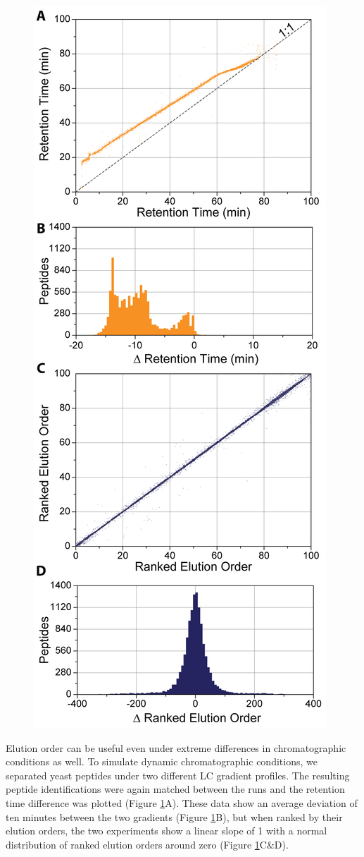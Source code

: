\begin{figure}[p]
	\centering
	\includegraphics[width=0.5\columnwidth]{eoa/EOA S2.png}
	\label{fig:eoas2}	
\end{figure} 

Elution order can be useful even under extreme differences in chromatographic conditions as well. To simulate dynamic chromatographic conditions, we separated yeast peptides under two different LC gradient profiles. The resulting peptide identifications were again matched between the runs and the retention time difference was plotted (Figure \ref{fig:eoas2}A). These data show an average deviation of ten minutes between the two gradients (Figure \ref{fig:eoas2}B), but when ranked by their elution orders, the two experiments show a linear slope of 1 with a normal distribution of ranked elution orders around zero (Figure \ref{fig:eoas2}C\&D). 


